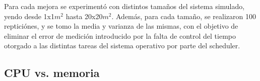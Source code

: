Para cada mejora se experimentó con distintos tamaños del sistema simulado, yendo desde 1x1$m^2$ hasta 20x20$m^2$. Además, para cada tamaño, se realizaron 100 repticiónes, y se tomo la media y varianza de las mismas, con el objetivo de eliminar el error de medición introducido por la falta de control del tiempo otorgado a las distintas tareas del sistema operativo por parte del scheduler.



\subsection{CPU vs. memoria}

